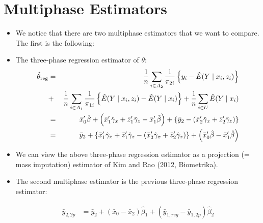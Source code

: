 
\section*{Multiphase Estimators}

\begin{itemize}
  \item We notice that there are two multiphase estimators that we want
    to compare. The first is the following:
  \item The three-phase regression estimator of $\theta$:
  \begin{eqnarray*} 
    \hat{\theta}_{\rm reg} &=& \frac{1}{n} \sum_{i \in A_2}\frac{1}{ \pi_{2i}
    }\left\{ y_{i}  - \hat{E} ( Y \mid x_i, z_{i} ) \right\} \\
    &+& \frac{1}{n} \sum_{i \in A_1}\frac{1}{ \pi_{1i}  }\left\{ \hat{E} ( Y
    \mid x_i, z_{i} ) - \hat{E} ( Y \mid x_i ) \right\} + \frac{1}{n} \sum_{i
    \in U} \hat{E} ( Y \mid x_i ) \\
    &=& \bar{x}_0' \hat{\beta} + \left( \bar{x}_1' \hat{\gamma}_x + \bar{z}_1'
    \hat{\gamma}_z - \bar{x}_1' \hat{\beta} \right) + \{ \bar{y}_2- (\bar{x}_2'
    \hat{\gamma}_x + \bar{z}_2' \hat{\gamma}_z ) \} \\
    &=& \bar{y}_2 + \{ \bar{x}_1' \hat{\gamma}_x + \bar{z}_1' \hat{\gamma}_z  -
    (\bar{x}_2' \hat{\gamma}_x + \bar{z}_2' \hat{\gamma}_z ) \} +\left(
    \bar{x}_0' \hat{\beta} - \bar{x}_1' \hat{\beta} \right) 
  \end{eqnarray*} 
  \item We can view the above three-phase regression estimator as a projection
    (= mass imputation) estimator of Kim and Rao (2012, Biometrika).
  \item The second multiphase estimator is the previous three-phase regression
    estimator:

    \begin{align*}
      \bar y_{2, 2p} &= \bar y_2 + (\bar x_0 - \bar x_{2}) \hat \beta_1 + 
      (\bar y_{1, reg} - \bar y_{1, 2p}) \hat \beta_2
    \end{align*}


\end{itemize}
